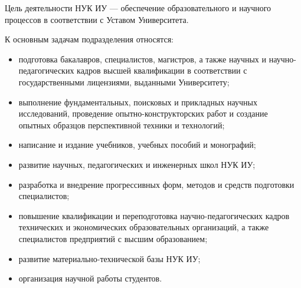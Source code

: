 Цель деятельности НУК ИУ —
обеспечение образовательного и научного процессов
в соответствии с Уставом Университета.

К основным задачам подразделения относятся:

\begin{itemize}
\item подготовка бакалавров, специалистов, магистров,
а также научных и научно-педагогических кадров
высшей квалификации в соответствии с государственными лицензиями,
выданными Университету;

\item выполнение фундаментальных, поисковых и прикладных
научных исследований, проведение опытно-конструкторских работ
и создание опытных образцов перспективной техники и технологий;

\item написание и издание учебников, учебных пособий и монографий;

\item развитие научных, педагогических и инженерных школ НУК ИУ;

\item разработка и внедрение прогрессивных форм, методов и средств
подготовки специалистов;

\item повышение квалификации и переподготовка научно-педагогических кадров
технических и экономических образовательных организаций,
а также специалистов предприятий с высшим образованием;

\item развитие материально-технической базы НУК ИУ;

\item организация научной работы студентов.
\end{itemize}
